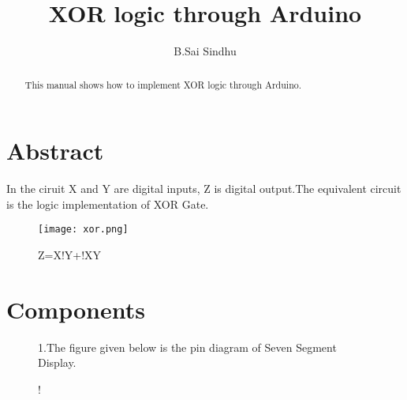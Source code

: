 \documentclass[journal,12pt,twocolumn]{IEEEtran}
\begin{document}
%

\theoremstyle{definition}
\newtheorem{theorem}{Theorem}[section]
\newtheorem{problem}{Problem}
\newtheorem{proposition}{Proposition}[section]
\newtheorem{lemma}{Lemma}[section]
\newtheorem{corollary}[theorem]{Corollary}
\newtheorem{example}{Example}[section]
\newtheorem{definition}{Definition}[section]
\newcommand{\BEQA}{\begin{eqnarray}}
\newcommand{\EEQA}{\end{eqnarray}}
\newcommand{\define}{\stackrel{\triangle}{=}}
\vspace{2cm}
\title{ 
XOR logic through Arduino
}

\author{B.Sai Sindhu}


\maketitle
\tableofcontents
%
\section{Abstract}

\begin{abstract}
This manual shows how to implement XOR logic through Arduino.
\end{abstract}

In the ciruit X and Y are digital inputs, Z is digital output.The equivalent circuit is the logic implementation of XOR Gate.
\begin{figure}[h]
    \centering
    \texttt{[image: xor.png]}
    \caption{Z=X!Y+!XY}
    \label{fig:circuit}
\end{figure}
\section{\textbf{Components}}

\begin{table}[!h]
\centering
\caption{}
\label{table:7447_disp}
\end{table}

\begin{figure}[!h]
1.The figure given below is the pin diagram of Seven Segment Display.\\
\begin{center}
\resizebox {0.4\columnwidth} {!} {

}
\end{center}
\caption{}
\label{fig:sevenseg}
\end{figure}
\end{document}
